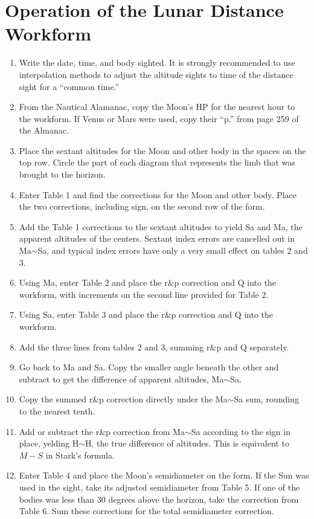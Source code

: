 \documentclass[letterpaper]{article}
\numberwithin{equation}{section}
\begin{document}
\clearpage \section{Operation of the Lunar Distance Workform}
	\begin{enumerate}
		\item Write the date, time, and body sighted. It is strongly recommended to use interpolation methods to adjust the altitude sights to time of the distance sight for a ``common time.''
		\item From the Nautical Alamanac, copy the Moon's HP for the nearest hour to the workform. If Venus or Mars were used, copy their ``p.'' from page 259 of the Almanac.
		\item Place the sextant altitudes for the Moon and other body in the spaces on the top row. Circle the part of each diagram that represents the limb that was brought to the horizon. 
		\item Enter Table 1 and find the corrections for the Moon and other body. Place the two corrections, including sign, on the second row of the form.
		\item Add the Table 1 corrections to the sextant altitudes to yield Sa and Ma, the apparent altitudes of the centers. Sextant index errors are cancelled out in Ma$\sim$Sa, and typical index errors have only a very small effect on tables 2 and 3.
		\item Using Ma, enter Table 2 and place the r\&p correction and Q into the workform, with increments on the second line provided for Table 2.
		\item Using Sa, enter Table 3 and place the r\&p correction and Q into the workform.
		\item Add the three lines from tables 2 and 3, summing r\&p and Q separately.
		\item Go back to Ma and Sa. Copy the smaller angle beneath the other and subtract to get the difference of apparent altitudes, Ma$\sim$Sa.
		\item Copy the summed r\&p correction directly under the Ma$\sim$Sa sum, rounding to the nearest tenth.
		\item Add or subtract the r\&p correction from Ma$\sim$Sa according to the sign in place, yelding H$\sim$H, the true difference of altitudes. This is equivalent to $M-S$ in Stark's formula.
		\item Enter Table 4 and place the Moon's semidiameter on the form. If the Sun was used in the sight, take its adjusted semidiameter from Table 5. If one of the bodies was less than 30 degrees above the horizon, take the correction from Table 6. Sum these corrections for the total semidiameter correction.

\end{enumerate}
\end{document}
